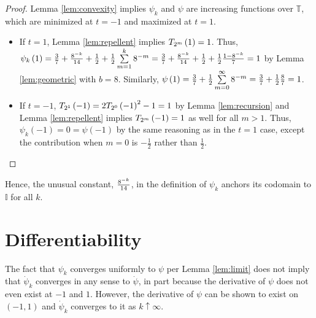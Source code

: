 \begin{proof}
  \leanok
  Lemma \ref{lem:convexity} implies $\psi_k$ and $\psi$ are increasing functions over $\mathbb{T}$, which are minimized at $t = -1$ and maximized at $t = 1$.
  \begin{itemize}
      \item If $t = 1$, Lemma \ref{lem:repellent} implies $T_{2^{m}}\left(1\right) = 1$. Thus, $\psi_k\left(1\right) = \frac{3}{7} + \frac{8^{-k}}{14} + \frac{1}{2} + \frac{1}{2} \sum\limits_{m = 1}^k 8^{-m} = \frac{3}{7} + \frac{8^{-k}}{14} + \frac{1}{2} + \frac{1}{2} \frac{1 - 8^{-k}}{7} = 1$ by Lemma \ref{lem:geometric} with $b = 8$. Similarly, $\psi\left(1\right) = \frac{3}{7} + \frac{1}{2} \sum\limits_{m = 0}^\infty 8^{-m} = \frac{3}{7} + \frac{1}{2} \frac{8}{7} = 1$.
      \item If $t = -1$, $T_{2^{1}}\left(-1\right) = 2 T_{2^{0}}\left(-1\right)^2 -1 = 1$ by Lemma \ref{lem:recursion} and Lemma \ref{lem:repellent} implies $T_{2^{m}}\left(-1\right) = 1$ as well for all $m > 1$.  Thus, $\psi_k\left(-1\right) = 0 = \psi\left(-1\right)$ by the same reasoning as in the $t = 1$ case, except the contribution when $m = 0$ is $-\frac{1}{2}$ rather than $\frac{1}{2}$.
  \end{itemize}
  
\end{proof}
\noindent Hence, the unusual constant, $\frac{8^{-k}}{14}$, in the definition of $\psi_k$ anchors its codomain to $\mathbb{I}$ for all $k$.

\section{Differentiability}\label{sec:Differentiability}

The fact that $\psi_k$ converges uniformly to $\psi$ per Lemma \ref{lem:limit} does not imply that $\dot{\psi}_k$ converges in any sense to $\dot{\psi}$, in part because the derivative of $\psi$ does not even exist at $-1$ and $1$. However, the derivative of $\psi$ can be shown to exist on $\left(-1,1\right)$ and $\dot{\psi}_k$ converges to it as $k \uparrow \infty$. 


